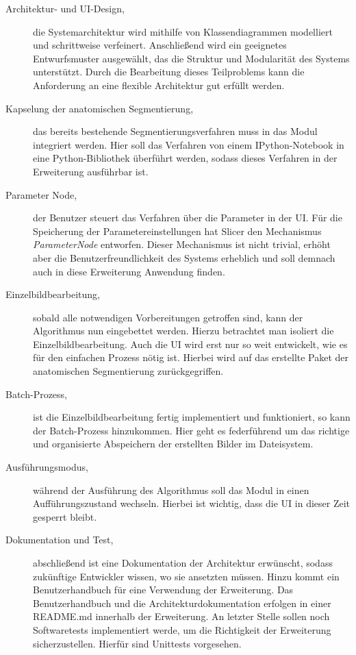 \begin{description}
	\item[Architektur- und \ac{UI}-Design,] die Systemarchitektur wird mithilfe von
		Klassendiagrammen modelliert und schrittweise verfeinert. Anschließend wird
		ein geeignetes Entwurfsmuster ausgewählt, das die Struktur und Modularität des
		Systems unterstützt. Durch die Bearbeitung dieses Teilproblems kann die
		Anforderung an eine flexible Architektur gut erfüllt werden.

	\item[Kapselung der anatomischen Segmentierung,] das bereits bestehende Segmentierungsverfahren
		muss in das Modul integriert werden. Hier soll das Verfahren von einem
		IPython-Notebook in eine Python-Bibliothek überführt werden, sodass dieses Verfahren
		in der Erweiterung ausführbar ist.

	\item[Parameter Node,] der Benutzer steuert das Verfahren über die Parameter in
		der \ac{UI}. Für die Speicherung der Parametereinstellungen hat Slicer den Mechanismus
		\textit{ParameterNode} entworfen. Dieser Mechanismus ist nicht trivial,
		erhöht aber die Benutzerfreundlichkeit des Systems erheblich und soll
		demnach auch in diese Erweiterung Anwendung finden.

	\item[Einzelbildbearbeitung,] sobald alle notwendigen Vorbereitungen getroffen
		sind, kann der Algorithmus nun eingebettet werden. Hierzu betrachtet man isoliert
		die Einzelbildbearbeitung. Auch die \ac{UI} wird erst nur so weit entwickelt,
		wie es für den einfachen Prozess nötig ist. Hierbei wird auf das erstellte Paket
		der anatomischen Segmentierung zurückgegriffen.

	\item[Batch-Prozess,] ist die Einzelbildbearbeitung fertig implementiert und funktioniert,
		so kann der Batch-Prozess hinzukommen. Hier geht es federführend um das richtige
		und organisierte Abspeichern der erstellten Bilder im Dateisystem.

	\item[Ausführungsmodus,] während der Ausführung des Algorithmus soll das Modul
		in einen Aufführungszustand wechseln. Hierbei ist wichtig, dass die \ac{UI}
		in dieser Zeit gesperrt bleibt.

	\item[Dokumentation und Test,] abschließend ist eine Dokumentation der Architektur
		erwünscht, sodass zukünftige Entwickler wissen, wo sie ansetzten müssen.
		Hinzu kommt ein Benutzerhandbuch für eine Verwendung der Erweiterung. Das Benutzerhandbuch
		und die Architekturdokumentation erfolgen in einer README.md innerhalb der Erweiterung.
		An letzter Stelle sollen noch Softwaretests implementiert werde, um die Richtigkeit
		der Erweiterung sicherzustellen. Hierfür sind Unittests vorgesehen.
\end{description}

